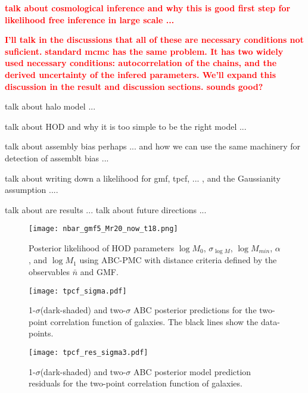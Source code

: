 \documentclass[12pt, preprint]{aastex}
\newcommand{\todo}[1]{{\bf \textcolor{red}{ #1}}}
\begin{document}
\todo{talk about cosmological inference and why this is good first step for likelihood free inference in large scale ...}

\todo{I'll talk in the discussions that all of these are necessary conditions not suficient.}
\todo{standard mcmc has the same problem. It has two widely used necessary conditions: autocorrelation of the chains, and the derived uncertainty of the infered parameters. We'll expand this discussion in the result and discussion sections. sounds good?}


talk about halo model ...

talk about HOD and why it is too simple to be the right model ...

talk about assembly bias perhaps ... and how we can use the same machinery for detection of assemblt bias ... 

talk about writing down a likelihood for gmf, tpcf, ... , and the Gaussianity assumption ....

talk about are results ...
talk about future directions ...

\begin{figure*}
\begin{center}
\texttt{[image: nbar\_gmf5\_Mr20\_now\_t18.png]}
\caption{Posterior likelihood of HOD parameters $\log M_0$, 
$\sigma_{\log M}$, $\log M_{min}$, $\alpha$, and $\log M_1$ using ABC-PMC 
with distance criteria defined by the observables $\bar{n}$ and GMF.}
\label{fig:post_abc_nbargmf}
\end{center}
\end{figure*}
\begin{figure*}
\begin{center}
  \texttt{[image: tpcf\_sigma.pdf]}
\caption{1-$\sigma$(dark-shaded) and two-$\sigma$ ABC posterior predictions
for the two-point correlation function of galaxies. The black lines show the data-points.}
\label{fig:gmf_cov}
\end{center}
\end{figure*}


\begin{figure*}
\begin{center}
  \texttt{[image: tpcf\_res\_sigma3.pdf]}
\caption{1-$\sigma$(dark-shaded) and two-$\sigma$ ABC posterior model prediction residuals
for the two-point correlation function of galaxies.}
\label{fig:2pcf-model}
\end{center}
\end{figure*}
\end{document}
